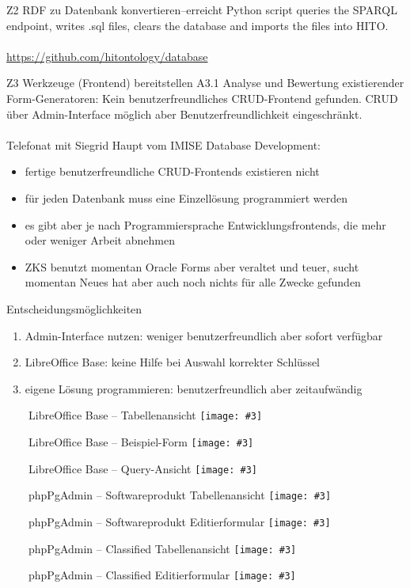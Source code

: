 \documentclass[aspectratio=169]{beamer}
\newcommand{\imageslide}[4][]
{
\begin{frame}[plain]{~~~~#2}
\vspace{0.2em}
\centering\texttt{[image: \#3]}
\\#1
\note{#4}
\end{frame}
}
\begin{document}
\begin{frame}{Z2 RDF zu Datenbank konvertieren--erreicht}
\url{}
Python script queries the SPARQL endpoint, writes .sql files, clears the database and imports the files into HITO.\\
~\\
\centering\url{https://github.com/hitontology/database}
\end{frame}

\begin{frame}{Z3 Werkzeuge (Frontend) bereitstellen}
A3.1 Analyse und Bewertung existierender Form-Generatoren: Kein benutzerfreundliches CRUD-Frontend gefunden.
CRUD über Admin-Interface möglich aber Benutzerfreundlichkeit eingeschränkt.\\
~\\
Telefonat mit Siegrid Haupt vom IMISE Database Development:\\
\begin{itemize}
\item fertige benutzerfreundliche CRUD-Frontends existieren nicht
\item für jeden Datenbank muss eine Einzellösung programmiert werden
\item es gibt aber je nach Programmiersprache Entwicklungsfrontends, die mehr oder weniger Arbeit abnehmen
\item ZKS benutzt momentan Oracle Forms aber veraltet und teuer, sucht momentan Neues hat aber auch noch nichts für alle Zwecke gefunden
\end{itemize}
\end{frame}

\begin{frame}{Entscheidungsmöglichkeiten}
\begin{enumerate}
\item Admin-Interface nutzen: weniger benutzerfreundlich aber sofort verfügbar
\item LibreOffice Base: keine Hilfe bei Auswahl korrekter Schlüssel
\item eigene Lösung programmieren: benutzerfreundlich aber zeitaufwändig
\end{enumerate}
\end{frame}

\imageslide{LibreOffice Base -- Tabellenansicht}{img_neu/base-tables.png}{}
\imageslide{LibreOffice Base -- Beispiel-Form}{img_neu/base-form.png}{}
\imageslide{LibreOffice Base -- Query-Ansicht}{img_neu/base-query.png}{}

\imageslide{phpPgAdmin -- Softwareprodukt Tabellenansicht}{img_neu/phppgadmin-product-list.png}{}
\imageslide{phpPgAdmin -- Softwareprodukt Editierformular}{img_neu/phppgadmin-product-edit.png}{}
\imageslide{phpPgAdmin -- Classified Tabellenansicht}{img_neu/phppgadmin-classified-list.png}{}
\imageslide{phpPgAdmin -- Classified Editierformular}{img_neu/phppgadmin-classified-edit.png}{}
\end{document}
